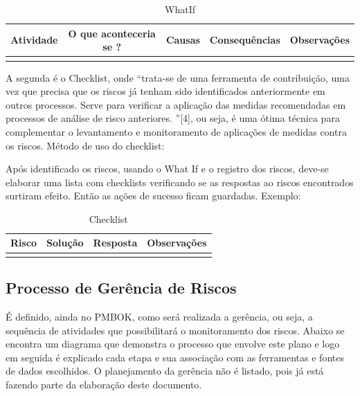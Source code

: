\begin{apendicesenv}
\begin{table}[htp]
    \centering
    \caption{WhatIf}
    \label{my-label}
    \begin{tabular}{|l|l|l|l|l|}
    \hline
    \multicolumn{1}{|c|}{\textbf{Atividade}} & \multicolumn{1}{c|}{\textbf{O que aconteceria se ?}} & \multicolumn{1}{c|}{\textbf{Causas}} & \textbf{Consequências} & \textbf{Observações} \\ \hline
     &  &  &  &  \\ \hline
    \end{tabular}
\end{table}

A segunda é o Checklist, onde “trata-se de uma ferramenta de contribuição, uma vez que precisa que os riscos já tenham sido identificados anteriormente em outros processos. Serve para verificar a aplicação das medidas recomendadas em processos de análise de risco anteriores. ”[4], ou seja, é uma ótima técnica para complementar o levantamento e monitoramento de aplicações de medidas contra os riscos. Método de uso do checklist:

Após identificado os riscos, usando o What If e o registro dos riscos, deve-se elaborar uma lista com checklists verificando se as respostas ao riscos encontrados surtiram efeito. Então as ações de sucesso ficam guardadas. Exemplo:

\begin{table}[htp]
    \centering
    \caption{Checklist}
    \label{my-label}
    \begin{tabular}{|l|l|l|l|}
    \hline
    \multicolumn{1}{|c|}{\textbf{Risco}} & \multicolumn{1}{c|}{\textbf{Solução}} & \multicolumn{1}{c|}{\textbf{Resposta}} & \multicolumn{1}{c|}{\textbf{Observações}} \\ \hline
     &  &  &  \\ \hline
    \end{tabular}
\end{table}

\subsection{Processo de Gerência de Riscos}
É definido, ainda no PMBOK, como será realizada a gerência, ou seja, a sequência de atividades que possibilitará o monitoramento dos riscos. Abaixo se encontra um diagrama que demonstra o processo que envolve este plano e logo em seguida é explicado cada etapa e sua associação com as ferramentas e fontes de dados escolhidos. O planejamento da gerência não é listado, pois já está fazendo parte da elaboração deste documento.


\end{apendicesenv}
